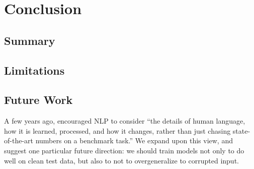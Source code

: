 \documentclass[letterpaper, 12pt]{report}
\begin{document}
\clearpage

\chapter{Conclusion}
\label{sec:org8fd280e}
\section{Summary}
\label{sec:org94aab9a}
\section{Limitations}
\label{sec:org217d56a}
\section{Future Work}
\label{sec:org9de237c}

A few years ago, \cite{manning-etal-2015-computational} encouraged NLP to consider ``the details of human language, how it is learned, processed, and how it changes, rather than just chasing state-of-the-art numbers on a benchmark task.'' We expand upon this view, and suggest one particular future direction: we should train models not only to do well on clean test data, but also to not to overgeneralize to corrupted input. %



\clearpage





\printglossaries


\end{document}
